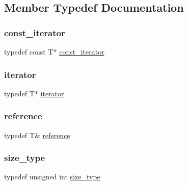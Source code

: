 \subsection{Member Typedef Documentation}
\mbox{\label{classvector_a2fc97dce62b7053449cc868607540dba}} 
\subsubsection{\texorpdfstring{const\+\_\+iterator}{const\_iterator}}
{\footnotesize\ttfamily typedef const T$\ast$ \mbox{\hyperlink{classvector_a2fc97dce62b7053449cc868607540dba}{const\+\_\+iterator}}}

\mbox{\label{classvector_a35c955cacac6aacaa1e82874b1628865}} 
\subsubsection{\texorpdfstring{iterator}{iterator}}
{\footnotesize\ttfamily typedef T$\ast$ \mbox{\hyperlink{classvector_a35c955cacac6aacaa1e82874b1628865}{iterator}}}

\mbox{\label{classvector_a9b1a63f171d76a7a3995b6858e99f2ea}} 
\subsubsection{\texorpdfstring{reference}{reference}}
{\footnotesize\ttfamily typedef T\& \mbox{\hyperlink{classvector_a9b1a63f171d76a7a3995b6858e99f2ea}{reference}}}

\mbox{\label{classvector_ada51e68d31936547d3729c82daf6b7c6}} 
\subsubsection{\texorpdfstring{size\+\_\+type}{size\_type}}
{\footnotesize\ttfamily typedef unsigned int \mbox{\hyperlink{classvector_ada51e68d31936547d3729c82daf6b7c6}{size\+\_\+type}}}



